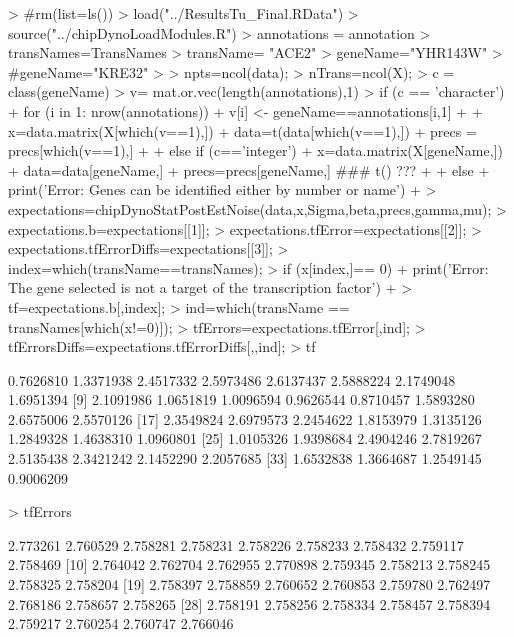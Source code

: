 \documentclass[11pt, a4paper, oneside]{article}
\begin{document}
\begin{Schunk}
\begin{Sinput}
> #rm(list=ls())
> load("../ResultsTu_Final.RData")
> source("../chipDynoLoadModules.R")
> annotations = annotation
> transNames=TransNames
> transName= "ACE2"
> geneName="YHR143W"
> #geneName="KRE32"
> 
> npts=ncol(data);
> nTrans=ncol(X);
> c = class(geneName)
> v= mat.or.vec(length(annotations),1)
> if (c == 'character'){
+   for (i in 1: nrow(annotations)) { 
+ 		v[i] <- geneName==annotations[i,1]
+ 		}
+ 	x=data.matrix(X[which(v==1),])
+ 	data=t(data[which(v==1),])
+ 	precs = precs[which(v==1),]
+ 
+ } else if (c=='integer'){
+ 	x=data.matrix(X[geneName,])
+ 	data=data[geneName,]
+ 	precs=precs[geneName,] ### t() ???
+ 
+ } else {
+ 	print('Error: Genes can be identified either by number or name')
+ }
> expectations=chipDynoStatPostEstNoise(data,x,Sigma,beta,precs,gamma,mu);
> expectations.b=expectations[[1]];
> expectations.tfError=expectations[[2]];
> expectations.tfErrorDiffs=expectations[[3]];
> index=which(transName==transNames);
> if (x[index,]== 0) {
+  print('Error: The gene selected is not a target of the transcription factor')
+ }
> tf=expectations.b[,index];
> ind=which(transName == transNames[which(x!=0)]);
> tfErrors=expectations.tfError[,ind];
> tfErrorsDiffs=expectations.tfErrorDiffs[,,ind];
> tf
\end{Sinput}
\begin{Soutput}
 [1] 0.7626810 1.3371938 2.4517332 2.5973486 2.6137437 2.5888224 2.1749048 1.6951394
 [9] 2.1091986 1.0651819 1.0096594 0.9626544 0.8710457 1.5893280 2.6575006 2.5570126
[17] 2.3549824 2.6979573 2.2454622 1.8153979 1.3135126 1.2849328 1.4638310 1.0960801
[25] 1.0105326 1.9398684 2.4904246 2.7819267 2.5135438 2.3421242 2.1452290 2.2057685
[33] 1.6532838 1.3664687 1.2549145 0.9006209
\end{Soutput}
\begin{Sinput}
> tfErrors
\end{Sinput}
\begin{Soutput}
 [1] 2.773261 2.760529 2.758281 2.758231 2.758226 2.758233 2.758432 2.759117 2.758469
[10] 2.764042 2.762704 2.762955 2.770898 2.759345 2.758213 2.758245 2.758325 2.758204
[19] 2.758397 2.758859 2.760652 2.760853 2.759780 2.762497 2.768186 2.758657 2.758265
[28] 2.758191 2.758256 2.758334 2.758457 2.758394 2.759217 2.760254 2.760747 2.766046
\end{Soutput}
\end{Schunk}

\end{document}
